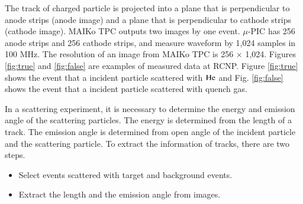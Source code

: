 \documentclass{jps-cp}
\begin{document}
The track of charged particle is projected into a plane that is perpendicular to anode strips (anode image) and
a plane that is perpendicular to cathode strips (cathode image).
MAIKo TPC outputs two images by one event.
$\mu$-PIC has 256 anode strips and 256 cathode strips,
and measure waveform by 1,024 samples in 100 MHz.
The resolution of an image from MAIKo TPC is 256 $\times$ 1,024.
Figures \ref{fig:true} and \ref{fig:false} are examples of measured data at RCNP.
Figure \ref{fig:true} shows the event that a incident particle scattered with $\rm{He}$ and
Fig. \ref{fig:false} shows the event that a incident particle scattered with quench gas.

In a scattering experiment, it is necessary to determine the energy and emission angle of the scattering particles.
The energy is determined from the length of a track.
The emission angle is determined from open angle of the incident particle and the scattering particle.
To extract the information of tracks, there are two steps.
\begin{itemize}
\item
  Select events scattered with target and background events.
\item
  Extract the length and the emission angle from images.
\end{itemize}
\end{document}
